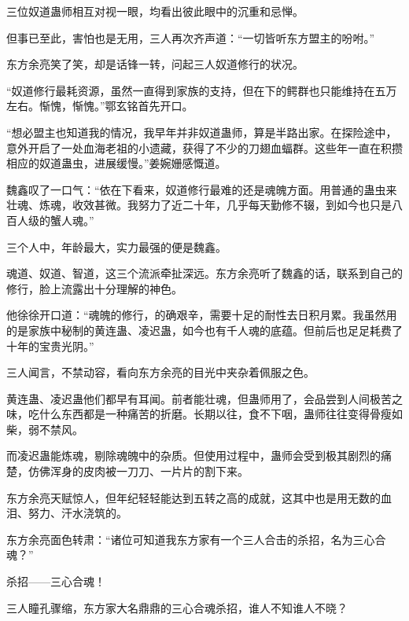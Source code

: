 \begin{this_body}
三位奴道蛊师相互对视一眼，均看出彼此眼中的沉重和忌惮。

但事已至此，害怕也是无用，三人再次齐声道：“一切皆听东方盟主的吩咐。”

东方余亮笑了笑，却是话锋一转，问起三人奴道修行的状况。

“奴道修行最耗资源，虽然一直得到家族的支持，但在下的鳄群也只能维持在五万左右。惭愧，惭愧。”鄂玄铭首先开口。

“想必盟主也知道我的情况，我早年并非奴道蛊师，算是半路出家。在探险途中，意外开启了一处血海老祖的小遗藏，获得了不少的刀翅血蝠群。这些年一直在积攒相应的奴道蛊虫，进展缓慢。”姜婉姗感慨道。

魏鑫叹了一口气：“依在下看来，奴道修行最难的还是魂魄方面。用普通的蛊虫来壮魂、炼魂，收效甚微。我努力了近二十年，几乎每天勤修不辍，到如今也只是八百人级的蟹人魂。”

三个人中，年龄最大，实力最强的便是魏鑫。

魂道、奴道、智道，这三个流派牵扯深远。东方余亮听了魏鑫的话，联系到自己的修行，脸上流露出十分理解的神色。

他徐徐开口道：“魂魄的修行，的确艰辛，需要十足的耐性去日积月累。我虽然用的是家族中秘制的黄连蛊、凌迟蛊，如今也有千人魂的底蕴。但前后也足足耗费了十年的宝贵光阴。”

三人闻言，不禁动容，看向东方余亮的目光中夹杂着佩服之色。

黄连蛊、凌迟蛊他们都早有耳闻。前者能壮魂，但蛊师用了，会品尝到人间极苦之味，吃什么东西都是一种痛苦的折磨。长期以往，食不下咽，蛊师往往变得骨瘦如柴，弱不禁风。

而凌迟蛊能炼魂，剔除魂魄中的杂质。但使用过程中，蛊师会受到极其剧烈的痛楚，仿佛浑身的皮肉被一刀刀、一片片的割下来。

东方余亮天赋惊人，但年纪轻轻能达到五转之高的成就，这其中也是用无数的血泪、努力、汗水浇筑的。

东方余亮面色转肃：“诸位可知道我东方家有一个三人合击的杀招，名为三心合魂？”

杀招——三心合魂！

三人瞳孔骤缩，东方家大名鼎鼎的三心合魂杀招，谁人不知谁人不晓？

\end{this_body}

